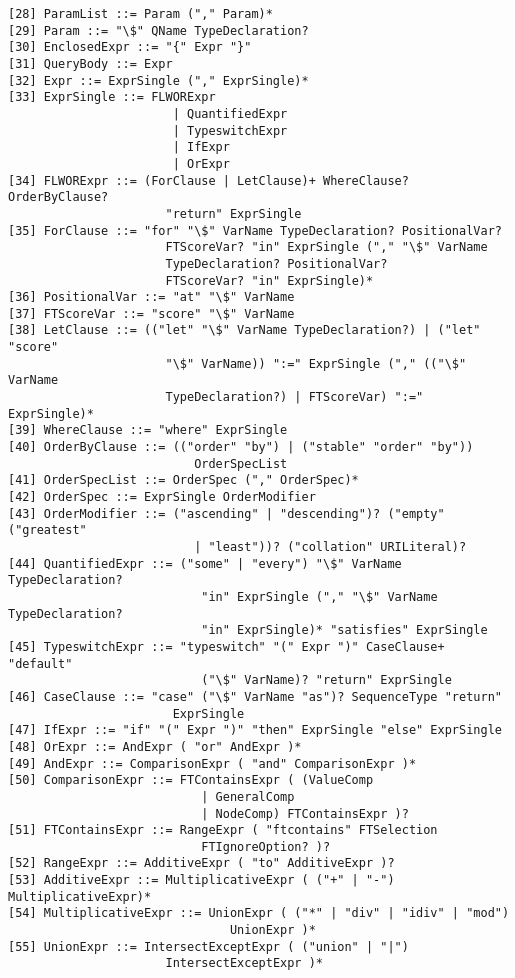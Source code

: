 \begin{verbatim}
[28] ParamList ::= Param ("," Param)*
[29] Param ::= "\$" QName TypeDeclaration?
[30] EnclosedExpr ::= "{" Expr "}"
[31] QueryBody ::= Expr
[32] Expr ::= ExprSingle ("," ExprSingle)*
[33] ExprSingle ::= FLWORExpr
                       | QuantifiedExpr
                       | TypeswitchExpr
                       | IfExpr
                       | OrExpr
[34] FLWORExpr ::= (ForClause | LetClause)+ WhereClause? OrderByClause?
                      "return" ExprSingle
[35] ForClause ::= "for" "\$" VarName TypeDeclaration? PositionalVar?
                      FTScoreVar? "in" ExprSingle ("," "\$" VarName
                      TypeDeclaration? PositionalVar?
                      FTScoreVar? "in" ExprSingle)* 
[36] PositionalVar ::= "at" "\$" VarName
[37] FTScoreVar ::= "score" "\$" VarName
[38] LetClause ::= (("let" "\$" VarName TypeDeclaration?) | ("let" "score"
                      "\$" VarName)) ":=" ExprSingle ("," (("\$" VarName
                      TypeDeclaration?) | FTScoreVar) ":=" ExprSingle)*
[39] WhereClause ::= "where" ExprSingle
[40] OrderByClause ::= (("order" "by") | ("stable" "order" "by"))
                          OrderSpecList 
[41] OrderSpecList ::= OrderSpec ("," OrderSpec)*
[42] OrderSpec ::= ExprSingle OrderModifier
[43] OrderModifier ::= ("ascending" | "descending")? ("empty" ("greatest"
                          | "least"))? ("collation" URILiteral)?
[44] QuantifiedExpr ::= ("some" | "every") "\$" VarName TypeDeclaration?
                           "in" ExprSingle ("," "\$" VarName TypeDeclaration?
                           "in" ExprSingle)* "satisfies" ExprSingle
[45] TypeswitchExpr ::= "typeswitch" "(" Expr ")" CaseClause+ "default"
                           ("\$" VarName)? "return" ExprSingle
[46] CaseClause ::= "case" ("\$" VarName "as")? SequenceType "return"
                       ExprSingle
[47] IfExpr ::= "if" "(" Expr ")" "then" ExprSingle "else" ExprSingle
[48] OrExpr ::= AndExpr ( "or" AndExpr )*
[49] AndExpr ::= ComparisonExpr ( "and" ComparisonExpr )*
[50] ComparisonExpr ::= FTContainsExpr ( (ValueComp
                           | GeneralComp
                           | NodeComp) FTContainsExpr )?
[51] FTContainsExpr ::= RangeExpr ( "ftcontains" FTSelection
                           FTIgnoreOption? )?
[52] RangeExpr ::= AdditiveExpr ( "to" AdditiveExpr )?
[53] AdditiveExpr ::= MultiplicativeExpr ( ("+" | "-") MultiplicativeExpr)*
[54] MultiplicativeExpr ::= UnionExpr ( ("*" | "div" | "idiv" | "mod")
                               UnionExpr )*
[55] UnionExpr ::= IntersectExceptExpr ( ("union" | "|")
                      IntersectExceptExpr )*

\end{verbatim}
